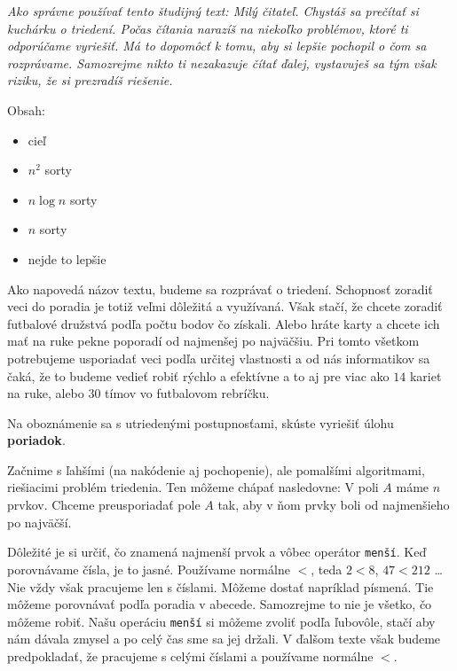 




\textit{Ako správne používať tento študijný text: Milý čitateľ. Chystáš sa prečítať si kuchárku o
triedení. Počas čítania narazíš na niekoľko problémov, ktoré ti odporúčame vyriešiť. Má to dopomôcť
k tomu, aby si lepšie pochopil o čom sa rozprávame. Samozrejme nikto ti nezakazuje čítať ďalej,
vystavuješ sa tým však riziku, že si prezradíš riešenie.}

Obsah:
\begin{itemize}
    \item cieľ
    \item $n^2$ sorty
    \item $n\log n$ sorty
    \item $n$ sorty
    \item nejde to lepšie
\end{itemize}

\medskip

Ako napovedá názov textu, budeme sa rozprávať o triedení. Schopnosť zoradiť veci do poradia je totiž
veľmi dôležitá a využívaná. Však stačí, že chcete zoradiť futbalové družstvá podľa počtu bodov čo
získali. Alebo hráte karty a chcete ich mať na ruke pekne poporadí od najmenšej po najväčšiu. Pri
tomto všetkom potrebujeme usporiadať veci podľa určitej vlastnosti a od nás informatikov sa čaká, že
to budeme vedieť robiť rýchlo a efektívne a to aj pre viac ako $14$ kariet na ruke, alebo $30$ tímov
vo futbalovom rebríčku.

\medskip

Na oboznámenie sa s utriedenými postupnosťami, skúste vyriešiť úlohu \textbf{poriadok}.


Začnime s ľahšími (na nakódenie aj pochopenie), ale pomalšími algoritmami, riešiacimi problém
triedenia. Ten môžeme chápať nasledovne: V poli $A$ máme $n$ prvkov. Chceme preusporiadať pole $A$
tak, aby v ňom prvky boli od najmenšieho po najväčší.

Dôležité je si určiť, čo znamená najmenší prvok a vôbec operátor \texttt{menší}. Keď porovnávame
čísla, je to jasné. Používame normálne $<$, teda $2<8$, $47<212$ \dots Nie vždy však pracujeme len s
číslami. Môžeme dostať napríklad písmená. Tie môžeme porovnávať podľa poradia v abecede. Samozrejme
to nie je všetko, čo môžeme robiť. Našu operáciu \texttt{menší} si môžeme zvoliť podľa ľubovôle,
stačí aby nám dávala zmysel a po celý čas sme sa jej držali. V ďalšom texte však budeme
predpokladať, že pracujeme s celými číslami a používame normálne $<$.

